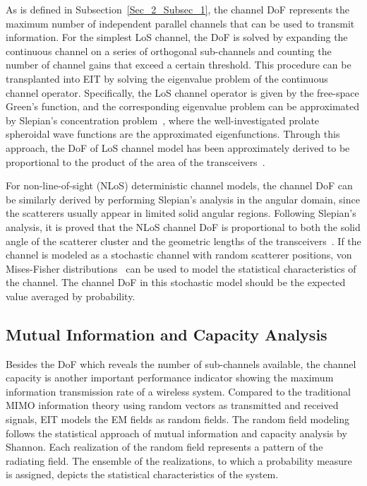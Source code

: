 \documentclass[journal,twocolumn]{IEEEtran}
\begin{document}
As is defined in Subsection~\ref{Sec_2_Subsec_1}, the channel DoF represents the maximum number of independent parallel channels that can be used to transmit information. 
For the simplest LoS channel, the DoF is solved by expanding the continuous channel on a series of orthogonal sub-channels and counting the number of channel gains that exceed a certain threshold. 
This procedure can be transplanted into EIT by solving the eigenvalue problem of the continuous channel operator. 
Specifically, the LoS channel operator is given by the free-space Green's function, and the corresponding eigenvalue problem can be approximated by Slepian's concentration problem~\cite{miller2000communicating}, where the well-investigated prolate spheroidal wave functions are the approximated eigenfunctions.  
Through this approach, the DoF of LoS channel model has been approximately derived to be proportional to the product of the area of the transceivers~\cite{pizzo2022nyquist,miller2000communicating}. 

For non-line-of-sight (NLoS) deterministic channel models, the channel DoF can be similarly derived by performing Slepian's analysis in the angular domain, since the scatterers usually appear in limited solid angular regions. 
Following Slepian's analysis, it is proved that the NLoS channel DoF is proportional to both the solid angle of the scatterer cluster and the geometric lengths of the transceivers~\cite{poon2005degrees}.   
If the channel is modeled as a stochastic channel with random scatterer positions, von Mises-Fisher distributions~\cite{byers2004spatially} can be used to model the statistical characteristics of the channel. 
The channel DoF in this stochastic model should be the expected value averaged by probability.


\subsection{Mutual Information and Capacity Analysis}
Besides the DoF which reveals the number of sub-channels available, the channel capacity is another important performance indicator showing the maximum information transmission rate of a wireless system. 
Compared to the traditional MIMO information theory using random vectors as transmitted and received signals, EIT models the EM fields as random fields. 
The random field modeling follows the statistical approach of mutual information and capacity analysis by Shannon. 
Each realization of the random field represents a pattern of the radiating field. The ensemble of the realizations, to which a probability measure is assigned, depicts the statistical characteristics of the system. 
\end{document}
